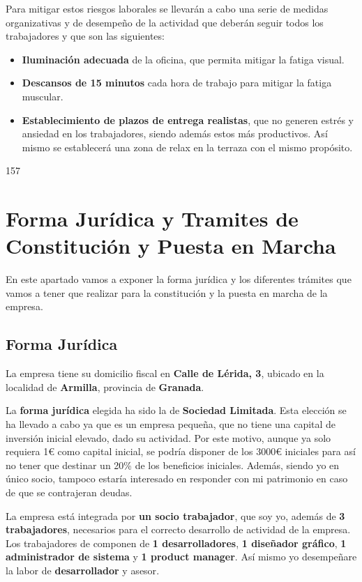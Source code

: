 Para mitigar estos riesgos laborales se llevarán a cabo una serie de medidas organizativas y de desempeño de la actividad que deberán seguir todos los trabajadores y que son las siguientes:

\begin{itemize}
    \item \textbf{Iluminación adecuada} de la oficina, que permita mitigar la fatiga visual.
    \item \textbf{Descansos de 15 minutos} cada hora de trabajo para mitigar la fatiga muscular.
    \item \textbf{Establecimiento de plazos de entrega realistas}, que no generen estrés y ansiedad en los trabajadores, siendo además
    estos más productivos. Así mismo se establecerá una zona de relax en la terraza con el mismo propósito.
\end{itemize}	157

\section{Forma Jurídica y Tramites de Constitución y Puesta en Marcha}
En este apartado vamos a exponer la forma jurídica y los diferentes trámites que vamos a tener que realizar para la constitución y la puesta en marcha de la empresa.

\subsection{Forma Jurídica}
La empresa tiene su domicilio fiscal en \textbf{Calle de Lérida, 3}, ubicado en la localidad de \textbf{Armilla}, provincia de \textbf{Granada}.

La \textbf{forma jurídica} elegida ha sido la de \textbf{Sociedad Limitada}. Esta elección se ha llevado a cabo ya que es un empresa pequeña, que no tiene una capital de inversión inicial elevado, dado su actividad. Por este motivo, aunque ya solo requiera 1€ como capital inicial, se podría disponer de los 3000€ iniciales para así no tener que destinar un 20\% de los beneficios iniciales. Además, siendo yo en único socio, tampoco estaría interesado en responder con mi patrimonio en caso de que se contrajeran deudas.

La empresa está integrada por \textbf{un socio trabajador}, que soy yo, además de \textbf{3 trabajadores}, necesarios para el correcto desarrollo de actividad de la empresa. Los trabajadores de componen de \textbf{1 desarrolladores}, \textbf{1 diseñador gráfico}, \textbf{1 administrador de sistema} y \textbf{1 product manager}. Así mismo yo desempeñare la labor de \textbf{desarrollador} y {asesor}.

